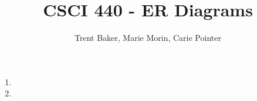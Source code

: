 \documentclass[10pt,letterpaper]{article}
\author{Trent Baker, Marie Morin, Carie Pointer}
\title{CSCI 440 - ER Diagrams}
\begin{document}
\maketitle
\begin{enumerate}
	\item
	\item
\end{enumerate}
\end{document}
